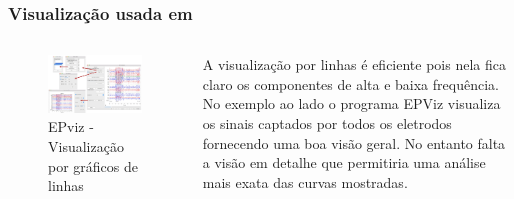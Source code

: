 \begin{frame}
	\frametitle{Visualização usada em \cite{currey2023epviz}}
	\begin{columns}
		\begin{column}{0.7\textwidth}
			\begin{figure}
				\centering
				\includegraphics[width=\linewidth]{images/epviz00}
				\caption{EPviz - Visualização por gráficos de linhas}
				\label{fig:epviz00}
			\end{figure}
		\end{column}
		\begin{column}{0.3\textwidth}
			\par A visualização por linhas é eficiente pois nela fica claro os componentes de alta e baixa frequência. No exemplo ao lado o programa EPViz visualiza os sinais captados por todos os eletrodos fornecendo uma boa visão geral. No entanto falta a visão em detalhe que permitiria uma análise mais exata das curvas mostradas.
		\end{column}
	\end{columns}
\end{frame}
